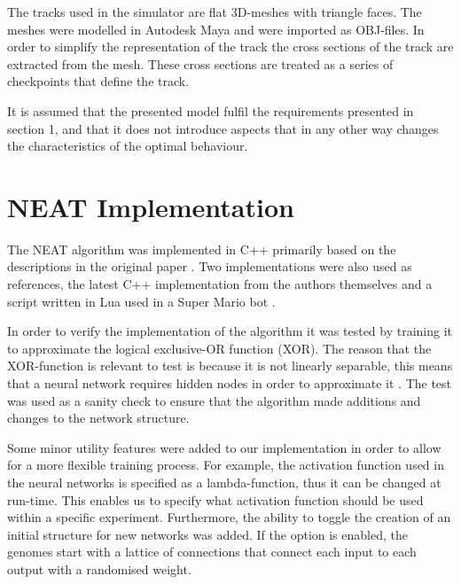 The tracks used in the simulator are flat 3D-meshes with triangle faces. The meshes were modelled in Autodesk Maya and were imported as OBJ-files. In order to simplify the representation of the track the cross sections of the track are extracted from the mesh. These cross sections are treated as a series of checkpoints that define the track.  

It is assumed that the presented model fulfil the requirements presented in section 1, and that it does not introduce aspects that in any other way changes the characteristics of the optimal behaviour.


\section{NEAT Implementation}

The NEAT algorithm was implemented in C++ primarily based on the descriptions in the original paper \cite{stanley:neat}. Two implementations were also used as references, the latest C++ implementation from the authors themselves \cite{neat_source} and a script written in Lua used in a Super Mario bot \cite{mario_source}. 

In order to verify the implementation of the algorithm it was tested by training it to approximate the logical exclusive-OR function (XOR). The reason that the XOR-function is relevant to test is because it is not linearly separable, this means that a neural network requires hidden nodes in order to approximate it \cite{haykin:xor, stanley:neat}. The test was used as a sanity check to ensure that the algorithm made additions and changes to the network structure. 

Some minor utility features were added to our implementation in order to allow for a more flexible training process. For example, the activation function used in the neural networks is specified as a lambda-function, thus it can be changed at run-time. This enables us to specify what activation function should be used within a specific experiment. Furthermore, the ability to toggle the creation of an initial structure for new networks was added. If the option is enabled, the genomes start with a lattice of connections that connect each input to each output with a randomised weight. 



